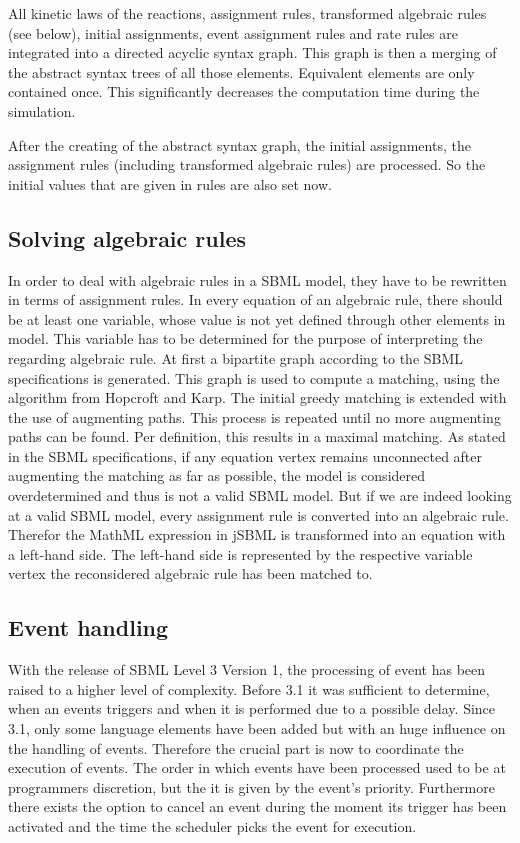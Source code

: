 \documentclass[10pt]{bmc_article}
\newenvironment{bmcformat}{\baselineskip20pt\sloppy\setboolean{publ}{false}}{\baselineskip20pt\sloppy}
\begin{document}
\begin{bmcformat}
All kinetic laws of the reactions, assignment rules, transformed algebraic rules (see below), initial assignments, event assignment rules and rate rules are integrated into a directed acyclic syntax graph. This graph is then a merging of the abstract syntax trees of all those elements. Equivalent elements are only contained once. This significantly decreases the computation time during the simulation.

After the creating of the abstract syntax graph, the initial assignments, the assignment rules (including transformed algebraic rules) are processed. So the initial values that are given in rules are also set now.


\subsection{Solving algebraic rules}
In order to deal with algebraic rules in a SBML model, they have to be rewritten in terms
of assignment rules. In every equation of an algebraic rule, there should be at least one variable, 
whose value is not yet defined through other elements in model. This variable has to be determined 
for the purpose of interpreting the regarding algebraic rule.
At first a bipartite graph according to the SBML specifications is generated. This graph is used to 
compute a matching, using the algorithm from Hopcroft and Karp\cite{hopcroft1973n}. The initial 
greedy matching is extended with the use of augmenting paths. This process is
repeated until no more augmenting paths can be found. Per definition, this results in a maximal matching. 
As stated in the SBML specifications, if any equation vertex remains unconnected after augmenting the 
matching as far as possible, the model is considered overdetermined and thus is not a valid SBML model. 
But if we are indeed looking at a valid SBML model, every assignment rule is converted into an algebraic rule. 
Therefor the MathML expression in jSBML is transformed into an equation with a left-hand side. The left-hand 
side is represented by the respective variable vertex the reconsidered algebraic rule has been matched to.


\subsection{Event handling}
With the release of SBML Level 3 Version 1, the processing of event has been raised to a higher level of 
complexity. Before 3.1 it was sufficient to determine, when an events triggers and when it is performed 
due to a possible delay. Since 3.1, only some language elements have been added but with an huge 
influence on the handling of events. Therefore the crucial part is now to coordinate the execution of events. 
The order in which events have been processed used to be at programmers discretion, but the it is given 
by the event's priority. Furthermore there exists the option to cancel an event during the moment its trigger 
has been activated and the time the scheduler picks the event for execution. 


\end{bmcformat}
\end{document}
